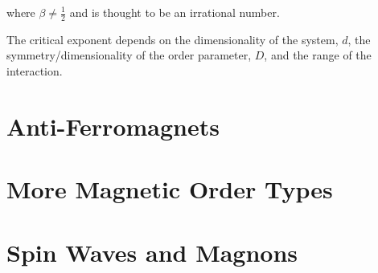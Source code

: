 \noindent where $\beta \neq \frac{1}{2}$ and is thought to be an irrational number.

\noindent The critical exponent depends on the dimensionality of the system, $d$, the symmetry/dimensionality of the order parameter, $D$, and the range of the interaction. 

\section{Anti-Ferromagnets}

\section{More Magnetic Order Types}

\section{Spin Waves and Magnons}